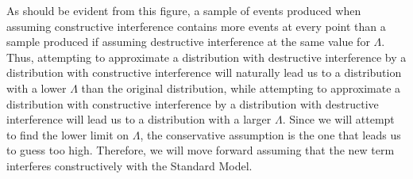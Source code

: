 As should be evident from this figure, a sample of events produced when assuming constructive interference contains more events at every point than a sample produced if assuming destructive interference at the same value for $\Lambda$. Thus, attempting to approximate a distribution with destructive interference by a distribution with constructive interference will naturally lead us to a distribution with a lower $\Lambda$ than the original distribution, while attempting to approximate a distribution with constructive interference by a distribution with destructive interference will lead us to a distribution with a larger $\Lambda$. Since we will attempt to find the lower limit on $\Lambda$, the conservative assumption is the one that leads us to guess too high. Therefore, we will move forward assuming that the new term interferes constructively with the Standard Model.



